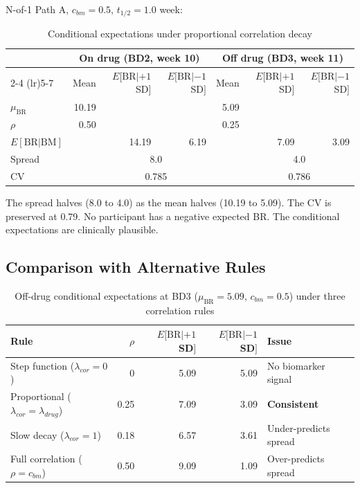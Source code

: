 \documentclass[11pt]{article}
\begin{document}
N-of-1 Path A, $c_{bm} = 0.5$, $t_{1/2} = 1.0$ week:

\begin{table}[h]
\centering
\caption{Conditional expectations under proportional
  correlation decay}
\begin{tabular}{lrrrrrr}
\toprule
& \multicolumn{3}{c}{On drug (BD2, week 10)} &
  \multicolumn{3}{c}{Off drug (BD3, week 11)} \\
\cmidrule(lr){2-4} \cmidrule(lr){5-7}
& Mean & $E[\text{BR}|+1$SD$]$ & $E[\text{BR}|-1$SD$]$ &
  Mean & $E[\text{BR}|+1$SD$]$ & $E[\text{BR}|-1$SD$]$ \\
\midrule
$\mu_{\text{BR}}$ & 10.19 & & & 5.09 & & \\
$\rho$ & 0.50 & & & 0.25 & & \\
$E[\text{BR}|\text{BM}]$ & & 14.19 & 6.19 & & 7.09 & 3.09 \\
Spread & & \multicolumn{2}{c}{8.0} & &
  \multicolumn{2}{c}{4.0} \\
CV & & \multicolumn{2}{c}{0.785} & &
  \multicolumn{2}{c}{0.786} \\
\bottomrule
\end{tabular}
\end{table}

The spread halves (8.0 to 4.0) as the mean halves (10.19 to
5.09). The CV is preserved at 0.79. No participant has a
negative expected BR. The conditional expectations are
clinically plausible.

\subsection{Comparison with Alternative Rules}

\begin{table}[h]
\centering
\caption{Off-drug conditional expectations at BD3
  ($\mu_{\text{BR}} = 5.09$, $c_{bm} = 0.5$) under
  three correlation rules}
\begin{tabular}{lrrrl}
\toprule
Rule & $\rho$ & $E[\text{BR}|+1$SD$]$ &
  $E[\text{BR}|-1$SD$]$ & Issue \\
\midrule
Step function ($\lambda_{cor} = 0$) & 0 & 5.09 & 5.09 &
  No biomarker signal \\
Proportional ($\lambda_{cor} = \lambda_{drug}$) & 0.25 &
  7.09 & 3.09 & \textbf{Consistent} \\
Slow decay ($\lambda_{cor} = 1$) & 0.18 & 6.57 & 3.61 &
  Under-predicts spread \\
Full correlation ($\rho = c_{bm}$) & 0.50 & 9.09 & 1.09 &
  Over-predicts spread \\
\bottomrule
\end{tabular}
\end{table}
\end{document}
